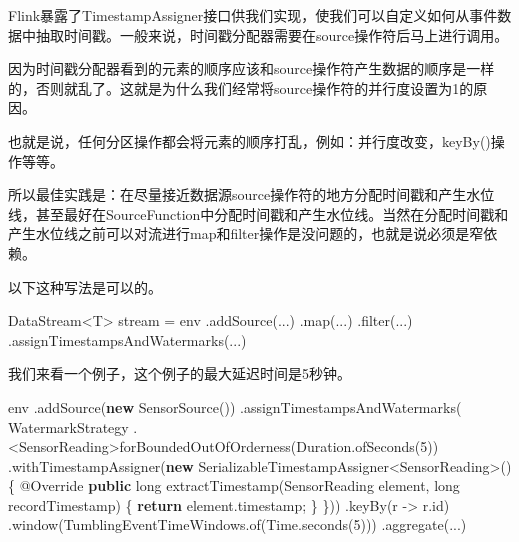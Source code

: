 \documentclass[cn,11pt,chinese]{elegantbook}
\newenvironment{Shaded}{}{}
\newcommand{\AttributeTok}[1]{\textcolor[rgb]{0.49,0.56,0.16}{#1}}
\newcommand{\BuiltInTok}[1]{#1}
\newcommand{\DataTypeTok}[1]{\textcolor[rgb]{0.56,0.13,0.00}{#1}}
\newcommand{\DecValTok}[1]{\textcolor[rgb]{0.25,0.63,0.44}{#1}}
\newcommand{\FunctionTok}[1]{\textcolor[rgb]{0.02,0.16,0.49}{#1}}
\newcommand{\KeywordTok}[1]{\textcolor[rgb]{0.00,0.44,0.13}{\textbf{#1}}}
\newcommand{\NormalTok}[1]{#1}
\renewenvironment{quote}{\begin{customblockquote}\list{}{\rightmargin=0em\leftmargin=0em}%
\item\relax\color{blockquote-text}\ignorespaces}{\unskip\unskip\endlist\end{customblockquote}}
\begin{document}
Flink暴露了TimestampAssigner接口供我们实现，使我们可以自定义如何从事件数据中抽取时间戳。一般来说，时间戳分配器需要在source操作符后马上进行调用。

\begin{quote}
因为时间戳分配器看到的元素的顺序应该和source操作符产生数据的顺序是一样的，否则就乱了。这就是为什么我们经常将source操作符的并行度设置为1的原因。
\end{quote}

也就是说，任何分区操作都会将元素的顺序打乱，例如：并行度改变，keyBy()操作等等。

所以最佳实践是：在尽量接近数据源source操作符的地方分配时间戳和产生水位线，甚至最好在SourceFunction中分配时间戳和产生水位线。当然在分配时间戳和产生水位线之前可以对流进行map和filter操作是没问题的，也就是说必须是窄依赖。

以下这种写法是可以的。

\begin{Shaded}
\begin{Highlighting}[]
\NormalTok{DataStream\textless{}T\textgreater{} stream = env}
\NormalTok{  .}\FunctionTok{addSource}\NormalTok{(...)}
\NormalTok{  .}\FunctionTok{map}\NormalTok{(...)}
\NormalTok{  .}\FunctionTok{filter}\NormalTok{(...)}
\NormalTok{  .}\FunctionTok{assignTimestampsAndWatermarks}\NormalTok{(...)}
\end{Highlighting}
\end{Shaded}

我们来看一个例子，这个例子的最大延迟时间是5秒钟。

\begin{Shaded}
\begin{Highlighting}[]
\NormalTok{env}
\NormalTok{  .}\FunctionTok{addSource}\NormalTok{(}\KeywordTok{new} \FunctionTok{SensorSource}\NormalTok{())}
\NormalTok{  .}\FunctionTok{assignTimestampsAndWatermarks}\NormalTok{(}
\NormalTok{    WatermarkStrategy}
\NormalTok{      .\textless{}SensorReading\textgreater{}}\FunctionTok{forBoundedOutOfOrderness}\NormalTok{(}\BuiltInTok{Duration}\NormalTok{.}\FunctionTok{ofSeconds}\NormalTok{(}\DecValTok{5}\NormalTok{))}
\NormalTok{      .}\FunctionTok{withTimestampAssigner}\NormalTok{(}\KeywordTok{new}\NormalTok{ SerializableTimestampAssigner\textless{}SensorReading\textgreater{}() \{}
        \AttributeTok{@Override}
        \KeywordTok{public} \DataTypeTok{long} \FunctionTok{extractTimestamp}\NormalTok{(SensorReading element, }\DataTypeTok{long}\NormalTok{ recordTimestamp) \{}
          \KeywordTok{return}\NormalTok{ element.}\FunctionTok{timestamp}\NormalTok{;}
\NormalTok{        \}}
\NormalTok{      \}))}
\NormalTok{    .}\FunctionTok{keyBy}\NormalTok{(r {-}\textgreater{} r.}\FunctionTok{id}\NormalTok{)}
\NormalTok{    .}\FunctionTok{window}\NormalTok{(TumblingEventTimeWindows.}\FunctionTok{of}\NormalTok{(}\BuiltInTok{Time}\NormalTok{.}\FunctionTok{seconds}\NormalTok{(}\DecValTok{5}\NormalTok{)))}
\NormalTok{    .}\FunctionTok{aggregate}\NormalTok{(...)}
\end{Highlighting}
\end{Shaded}
\end{document}
